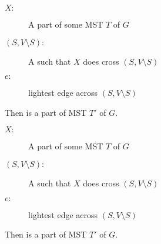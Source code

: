 
\begin{frame}{}
  \begin{theorem}
    \begin{description}
      \item[$X:$] A part of some MST $T$ of $G$
      \item[$(S, V \setminus S):$] A  such that $X$ does  cross $(S, V \setminus S)$
    ­  \item[$e:$]  lightest edge across $(S, V \setminus S)$
    \end{description}

    \begin{center}
      {Then  is a part of  MST $T'$ of $G$.}
    \end{center}
  \end{theorem}
\end{frame}

\begin{frame}{}
\end{frame}

\begin{frame}{}
  \begin{theorem}
    \begin{description}
      \item[$X:$] A part of some MST $T$ of $G$
      \item[$(S, V \setminus S):$] A  such that $X$ does  cross $(S, V \setminus S)$
    ­  \item[$e:$]  lightest edge across $(S, V \setminus S)$
    \end{description}

    \begin{center}
      {Then  is a part of  MST $T'$ of $G$.}
    \end{center}
  \end{theorem}

  \pause
  \vspace{0.60cm}
  \begin{center}
    {}
  \end{center}
\end{frame}

